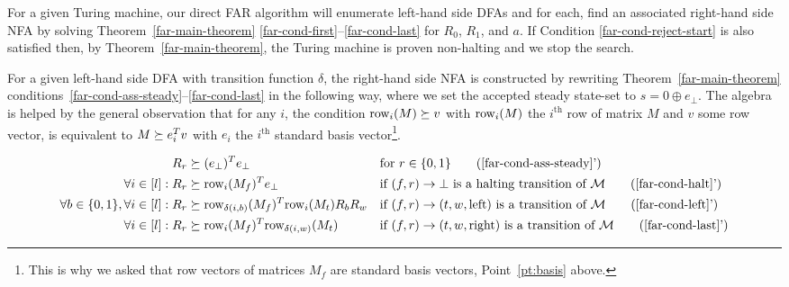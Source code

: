 For a given Turing machine, our direct FAR algorithm will enumerate left-hand side DFAs and for each, find an associated right-hand side NFA by solving Theorem~\ref{far-main-theorem} \eqref{far-cond-first}--\eqref{far-cond-last} for $R_0$, $R_1$, and $a$. If Condition \eqref{far-cond-reject-start} is also satisfied then, by Theorem~\ref{far-main-theorem}, the Turing machine is proven non-halting and we stop the search.


For a given left-hand side DFA with transition function $\delta$, the right-hand side NFA is constructed by rewriting Theorem~\ref{far-main-theorem} conditions~\eqref{far-cond-ass-steady}--\eqref{far-cond-last} in the following way, where we set the accepted steady state-set to $s=0\oplus e_\bot$. The algebra is helped by the general observation that for any $i$, the condition $\text{row}_i(M) \succeq v$ with $\text{row}_i(M)$ the $i^\text{th}$ row of matrix $M$ and $v$ some row vector, is equivalent to $M\succeq e_i^T v$ with $e_i$ the $i^\text{th}$ standard basis vector\footnote{This is why we asked that row vectors of matrices $M_f$ are standard basis vectors, Point~\ref{pt:basis} above.}.



\begin{align}
  R_r                                        & \succeq (e_\bot)\T e_\bot
                                             &                                                  & \text{for }r\in\{0,1\}
  \tag{\ref{far-cond-ass-steady}'}
  \\
  \forall i\in[l]: R_r                       & \succeq \row_i(M_f)\T e_\bot
                                             &                                                  & \text{if $(f,r) \to \bot$ is a halting transition of $\mathcal{M}$}
  \tag{\ref{far-cond-halt}'}
  \\
  \forall b \in\{0,1\}, \forall i\in[l]: R_r & \succeq
  \row_{\delta(i,b)}(M_f)\T \row_i(M_t)R_b R_w
                                             &                                                  & \text{if $(f,r) \to (t,w,\text{left})$ is a transition of $\mathcal{M}$}
  \tag{\ref{far-cond-left}'}
  \\
  \forall i\in[l]: R_r                       & \succeq \row_i(M_f)\T \row_{\delta(i,w)}(M_t)
                                             &                                                  & \text{if $(f,r) \to (t,w,\text{right})$ is a transition of $\mathcal{M}$}
  \tag{\ref{far-cond-last}'}
\end{align}

